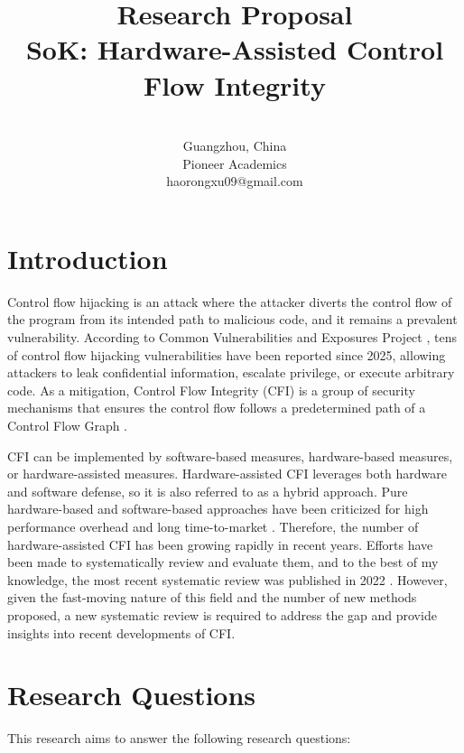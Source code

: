 \documentclass[journal,onecolumn]{IEEEtran}
\begin{document}
\title{Research Proposal \\[0.3cm] \large SoK: Hardware-Assisted Control Flow Integrity}
\author{\\
		Guangzhou, China \\
        Pioneer Academics \\
		haorongxu09@gmail.com}
\maketitle

\section{Introduction}

Control flow hijacking is an attack where the attacker diverts the control flow of the program from its intended path to malicious code, and it remains a prevalent vulnerability. According to Common Vulnerabilities and Exposures Project \cite{cve-website}, tens of control flow hijacking vulnerabilities have been reported since 2025, allowing attackers to leak confidential information, escalate privilege, or execute arbitrary code. As a mitigation, Control Flow Integrity (CFI) is a group of security mechanisms that ensures the control flow follows a predetermined path of a Control Flow Graph \cite{Abadi05}.

CFI can be implemented by software-based measures, hardware-based measures, or hardware-assisted measures. Hardware-assisted CFI leverages both hardware and software defense, so it is also referred to as a hybrid approach. Pure hardware-based and software-based approaches have been criticized for high performance overhead and long time-to-market \cite{Kumar22}. Therefore, the number of hardware-assisted CFI has been growing rapidly in recent years. Efforts have been made to systematically review and evaluate them, and to the best of my knowledge, the most recent systematic review was published in 2022 \cite{Kumar22}. However, given the fast-moving nature of this field and the number of new methods proposed, a new systematic review is required to address the gap and provide insights into recent developments of CFI.

\section{Research Questions}

This research aims to answer the following research questions:
\end{document}
